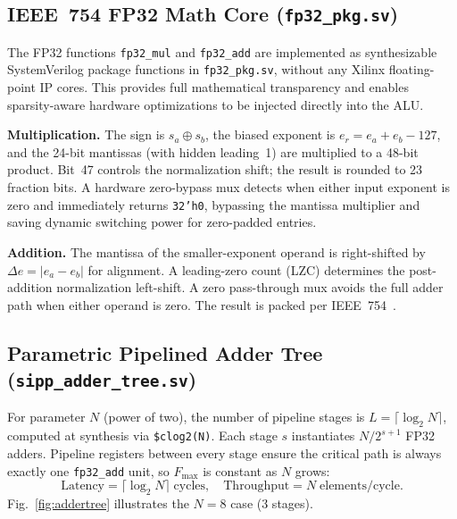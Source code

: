 \documentclass[journal,a4paper]{IEEEtran}
\begin{document}
\subsection{IEEE~754 FP32 Math Core (\texttt{fp32\_pkg.sv})}

The FP32 functions \texttt{fp32\_mul} and \texttt{fp32\_add} are
implemented as synthesizable SystemVerilog package functions in
\texttt{fp32\_pkg.sv}, without any Xilinx floating-point IP cores.
This provides full mathematical transparency and enables sparsity-aware
hardware optimizations to be injected directly into the ALU.

\textbf{Multiplication.}
The sign is $s_a \oplus s_b$, the biased exponent is
$e_r = e_a + e_b - 127$, and the 24-bit mantissas (with hidden leading~1)
are multiplied to a 48-bit product. Bit~47 controls the normalization
shift; the result is rounded to 23 fraction bits.
A hardware zero-bypass mux detects when either input exponent is zero
and immediately returns \texttt{32'h0}, bypassing the mantissa
multiplier and saving dynamic switching power for zero-padded entries.

\textbf{Addition.}
The mantissa of the smaller-exponent operand is right-shifted by
$\Delta e = |e_a - e_b|$ for alignment. A leading-zero count (LZC)
determines the post-addition normalization left-shift. A zero
pass-through mux avoids the full adder path when either operand is zero.
The result is packed per IEEE~754~\cite{ieee754}.

\subsection{Parametric Pipelined Adder Tree (\texttt{sipp\_adder\_tree.sv})}

For parameter $N$ (power of two), the number of pipeline stages is
$L = \lceil\log_2 N\rceil$, computed at synthesis via \texttt{\$clog2(N)}.
Each stage $s$ instantiates $N/2^{s+1}$ FP32 adders.
Pipeline registers between every stage ensure the critical path is always
exactly one \texttt{fp32\_add} unit, so $F_{\max}$ is constant as $N$ grows:
\begin{equation}
\text{Latency} = \lceil\log_2 N\rceil\;\text{cycles},\quad
\text{Throughput} = N\;\text{elements/cycle.}
\label{eq:scaling}
\end{equation}
Fig.~\ref{fig:addertree} illustrates the $N=8$ case (3 stages).
\end{document}
